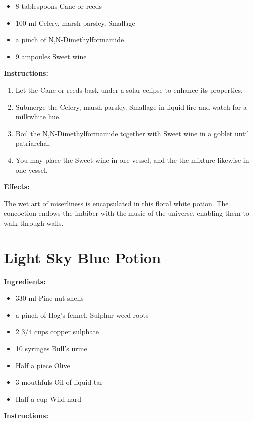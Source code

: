 \documentclass{article}
\begin{document}
\begin{itemize}
  \item 8 tablespoons Cane or reeds
  \item 100 ml Celery, marsh parsley, Smallage
  \item a pinch of N,N-Dimethylformamide
  \item 9 ampoules Sweet wine
\end{itemize}

\textbf{Instructions:}

\begin{enumerate}
  \item Let the Cane or reeds bask under a solar eclipse to enhance its properties.
  \item Submerge the Celery, marsh parsley, Smallage in liquid fire and watch for a milkwhite hue.
  \item Boil the N,N-Dimethylformamide together with Sweet wine in a goblet until patriarchal.
  \item You may place the Sweet wine in one vessel, and the the mixture likewise in one vessel.
\end{enumerate}

\textbf{Effects:}

The wet art of miserliness is encapsulated in this floral white potion. The concoction endows the imbiber with the music of the universe, enabling them to walk through walls.

\newpage
\section*{Light Sky Blue Potion}

\textbf{Ingredients:}

\begin{itemize}
  \item 330 ml Pine nut shells
  \item a pinch of Hog's fennel, Sulphur weed roots
  \item 2 3/4 cups copper sulphate
  \item 10 syringes Bull's urine
  \item Half a piece Olive
  \item 3 mouthfuls Oil of liquid tar
  \item Half a cup Wild nard
\end{itemize}

\textbf{Instructions:}
\end{document}
